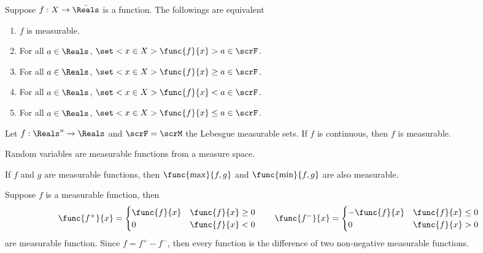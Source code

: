 \begin{lemma}
    Suppose \(f: X \to \bar{\Reals}\) is a function. The followings are equivalent 
    \begin{enumerate}
        \item \(f\) is measurable. 
        \item For all \(a \in \Reals\), \(\set<x \in X>{\func{f}{x} > a} \in \scrF\).
        \item For all \(a \in \Reals\), \(\set<x \in X>{\func{f}{x} \geq a} \in \scrF\).
        \item  For all \(a \in \Reals\), \(\set<x \in X>{\func{f}{x} < a} \in \scrF\).
        \item For all \(a \in \Reals\), \(\set<x \in X>{\func{f}{x} \leq a} \in \scrF\).
    \end{enumerate}
\end{lemma}

\begin{example}
    Let \(f:\Reals^n \to \Reals\) and \(\scrF = \scrM\) the Lebesgue measurable sets. If \(f\) is continuous, then \(f\) is measurable. 
\end{example}

Random variables are measurable functions from a measure space. 

\begin{theorem}
    If \(f\) and \(g\) are measurable functions, then \(\func{\max}{f,g}\) and \(\func{\min}{f,g}\) are also measurable. 
\end{theorem}

\begin{corollary}
    Suppose \(f\) is a measurable function, then 
    \begin{equation*}
        \func{f^+}{x} = \begin{cases}
            \func{f}{x} & \func{f}{x} \geq 0 \\
            0 & \func{f}{x} < 0
        \end{cases}
        \qquad 
        \func{f^-}{x} = \begin{cases}
            -\func{f}{x} & \func{f}{x} \leq 0 \\
            0 & \func{f}{x} > 0
        \end{cases}
    \end{equation*}
    are measurable function. Since \(f = f^+ - f^-\), then every function is the difference of two non-negative measurable functions.
\end{corollary}

